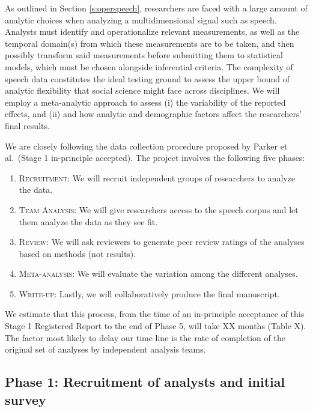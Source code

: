 \documentclass[
  12pt,
]{article}
\providecommand{\tightlist}{%
  \setlength{\itemsep}{0pt}\setlength{\parskip}{0pt}}
\begin{document}
As outlined in Section \ref{s:operspeech}, researchers are faced with a large amount of analytic choices when analyzing a multidimensional signal such as speech.
Analysts must identify and operationalize relevant measurements, as well as the temporal domain(s) from which these measurements are to be taken, and then possibly transform said measurements before submitting them to statistical models, which must be chosen alongside inferential criteria.
The complexity of speech data constitutes the ideal testing ground to assess the upper bound of analytic flexibility that social science might face across disciplines.
We will employ a meta-analytic approach to assess (i) the variability of the reported effects, and (ii) and how analytic and demographic factors affect the researchers' final results.

We are closely following the data collection procedure proposed by Parker et al.~(Stage 1 in-principle accepted).
The project involves the following five phases:

\begin{enumerate}
\def\labelenumi{\arabic{enumi}.}
\tightlist
\item
  \textsc{Recruitment}: We will recruit independent groups of researchers to analyze the data.
\item
  \textsc{Team Analysis}: We will give researchers access to the speech corpus and let them analyze the data as they see fit.
\item
  \textsc{Review}: We will ask reviewers to generate peer review ratings of the analyses based on methods (not results).
\item
  \textsc{Meta-analysis}: We will evaluate the variation among the different analyses.
\item
  \textsc{Write-up}: Lastly, we will collaboratively produce the final manuscript.
\end{enumerate}

We estimate that this process, from the time of an in-principle acceptance of this Stage 1 Registered Report to the end of Phase 5, will take XX months (Table X).
The factor most likely to delay our time line is the rate of completion of the original set of analyses by independent analysis teams.

\hypertarget{phase-1-recruitment-of-analysts-and-initial-survey}{%
\subsection{Phase 1: Recruitment of analysts and initial survey}\label{phase-1-recruitment-of-analysts-and-initial-survey}}
\end{document}

